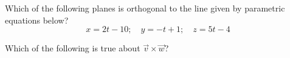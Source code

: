 \documentclass{ximera}
\author{}
\begin{document}
\begin{exercise}
Which of the following planes is orthogonal to the line given by parametric equations below?
$$x=2t-10;\quad y=-t+1;\quad z=5t-4$$

Which of the following is true about $\vec{v}\times \vec{w}$?
\begin{multipleChoice}
 \end{multipleChoice}
\end{exercise}
\end{document}
